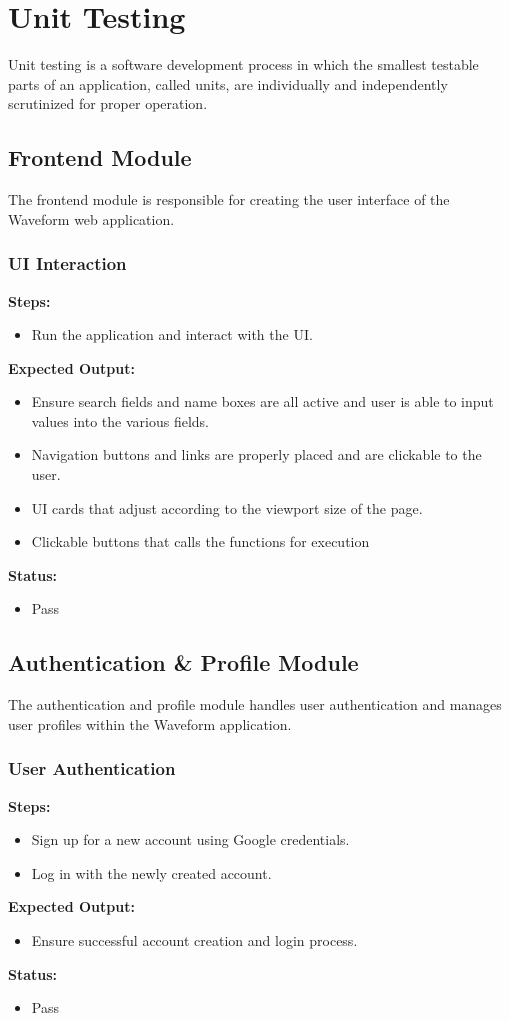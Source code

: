 \documentclass[11pt]{report}
\begin{document}
\section{Unit Testing}
 Unit testing is a software development process in which the smallest testable parts of an application, called units, are individually and independently scrutinized for proper operation.
\subsection{Frontend Module}
The frontend module is responsible for creating the user interface of the Waveform web application.

\subsubsection*{UI Interaction}
\textbf{Steps:}
\begin{itemize}
    \item Run the application and interact with the UI.
\end{itemize}
\textbf{Expected Output:}
\begin{itemize}
    \item Ensure search fields and name boxes are all active and user is able to input values into the various fields.
    \item Navigation buttons and links are properly placed and are clickable to the user.
    \item  UI cards that adjust according to the viewport size of the page.
    \item Clickable buttons that calls the functions for execution
\end{itemize}
\textbf{Status:}
\begin{itemize}
    \item Pass
\end{itemize}

\subsection{Authentication \& Profile Module}
The authentication and profile module handles user authentication and manages user profiles within the Waveform application.

\subsubsection*{User Authentication}
\textbf{Steps:}
\begin{itemize}
    \item Sign up for a new account using Google credentials.
    \item Log in with the newly created account.
\end{itemize}
\textbf{Expected Output:}
\begin{itemize}
    \item Ensure successful account creation and login process.
\end{itemize}
\textbf{Status:}
\begin{itemize}
    \item Pass
\end{itemize}
\end{document}
